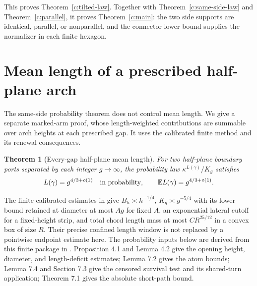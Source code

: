 \documentclass[11pt]{article}
\numberwithin{equation}{section}
\newtheorem{theorem}{Theorem}[section]
\theoremstyle{definition}\newtheorem{definition}[theorem]{Definition}
\theoremstyle{remark}\newtheorem{remark}[theorem]{Remark}
\begin{document}
This proves Theorem~\ref{c:tilted-law}. Together with
Theorem~\ref{c:same-side-law} and Theorem~\ref{c:parallel}, it proves
Theorem~\ref{c:main}: the two side supports are identical, parallel, or
nonparallel, and the connector lower bound supplies the normalizer in
each finite hexagon.

\section{Mean length of a prescribed half-plane arch}\label{c:mean}
The same-side probability theorem does not control mean length.
We give a separate marked-arm proof, whose length-weighted contributions
are summable over arch heights at each prescribed gap.
It uses the calibrated finite method and its renewal consequences.

\begin{theorem}[Every-gap half-plane mean length]\label{c:arch-mean}
For two half-plane boundary ports separated by each integer $g\to\infty$,
the probability law $\kappa^{L(\gamma)}/K_g$ satisfies
\[
 L(\gamma)=g^{4/3+o(1)}\quad\hbox{in probability},\qquad
 \mathbb E L(\gamma)=g^{4/3+o(1)}.
\]
\end{theorem}
The finite calibrated estimates in \cite[Theorem 1.2 and Proposition 11.1]{Calibrated} give
$B_h\asymp h^{-1/4}$, $K_g\asymp g^{-5/4}$ with its lower bound
retained at diameter at most $Ag$ for fixed $A$, an exponential lateral
cutoff for a fixed-height strip, and total chord length mass at most
$CR^{25/12}$ in a convex box of size $R$. Their precise confined
length window is not replaced by a pointwise endpoint estimate here.
The probability inputs below are derived from this finite package
in \cite[Proposition 4.1, Lemma 4.2, Lemmas 7.2 and 7.4,
Section 7.3, and Theorem 7.1]{Renewal}.
Proposition 4.1 and Lemma 4.2 give the opening height, diameter,
and length-deficit estimates; Lemma 7.2 gives the atom bounds;
Lemma 7.4 and Section 7.3 give the censored survival test and its
shared-turn application; Theorem 7.1 gives the absolute short-path bound.
\end{document}
